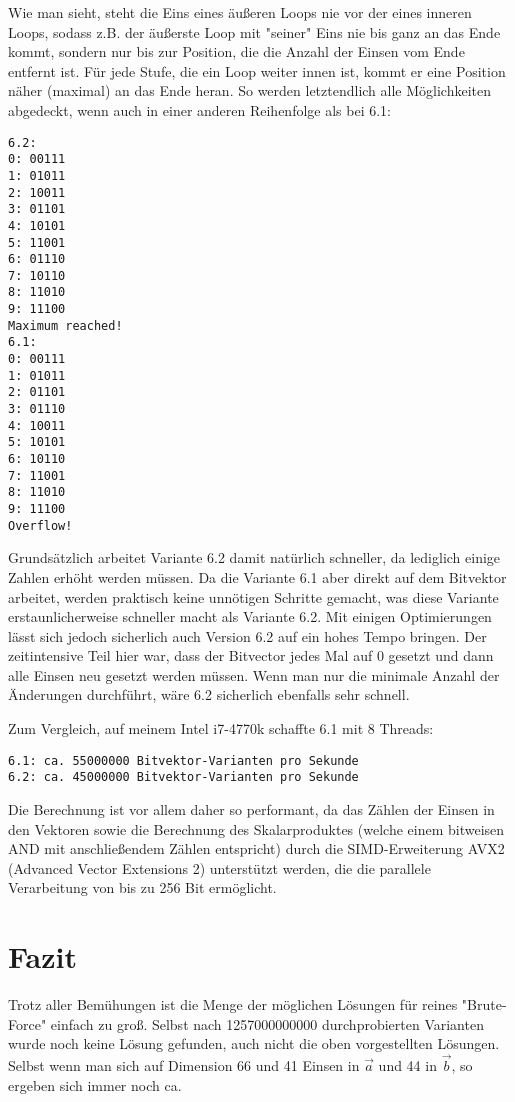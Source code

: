 \documentclass{article}
\begin{document}
Wie man sieht, steht die Eins eines äußeren Loops nie vor der eines inneren Loops, sodass z.B. der äußerste Loop mit "seiner" Eins nie bis ganz an das Ende kommt, sondern nur bis zur Position, die die Anzahl der Einsen vom Ende entfernt ist. Für jede Stufe, die ein Loop weiter innen ist, kommt er eine Position näher (maximal) an das Ende heran. So werden letztendlich alle Möglichkeiten abgedeckt, wenn auch in einer anderen Reihenfolge als bei 6.1:

\begin{lstlisting}[frame=single]
6.2: 
0: 00111
1: 01011
2: 10011
3: 01101
4: 10101
5: 11001
6: 01110
7: 10110
8: 11010
9: 11100
Maximum reached!
6.1:
0: 00111
1: 01011
2: 01101
3: 01110
4: 10011
5: 10101
6: 10110
7: 11001
8: 11010
9: 11100
Overflow!
\end{lstlisting}

Grundsätzlich arbeitet Variante 6.2 damit natürlich schneller, da lediglich einige Zahlen erhöht werden müssen. Da die Variante 6.1 aber direkt auf dem Bitvektor arbeitet, werden praktisch keine unnötigen Schritte gemacht, was diese Variante erstaunlicherweise schneller macht als Variante 6.2. Mit einigen Optimierungen lässt sich jedoch sicherlich auch Version 6.2 auf ein hohes Tempo bringen. Der zeitintensive Teil hier war, dass der Bitvector jedes Mal auf 0 gesetzt und dann alle Einsen neu gesetzt werden müssen. Wenn man nur die minimale Anzahl der Änderungen durchführt, wäre 6.2 sicherlich ebenfalls sehr schnell.

Zum Vergleich, auf meinem Intel i7-4770k schaffte 6.1 mit 8 Threads:
\begin{lstlisting}[frame=single]
6.1: ca. 55000000 Bitvektor-Varianten pro Sekunde
6.2: ca. 45000000 Bitvektor-Varianten pro Sekunde
\end{lstlisting}

Die Berechnung ist vor allem daher so performant, da das Zählen der Einsen in den Vektoren sowie die Berechnung des Skalarproduktes (welche einem bitweisen AND mit anschließendem Zählen entspricht) durch die SIMD-Erweiterung AVX2 (Advanced Vector Extensions 2) unterstützt werden, die die parallele Verarbeitung von bis zu 256 Bit ermöglicht.

\section{Fazit}

Trotz aller Bemühungen ist die Menge der möglichen Lösungen für reines "Brute-Force" einfach zu groß. Selbst nach 1257000000000 durchprobierten Varianten wurde noch keine Lösung gefunden, auch nicht die oben vorgestellten Lösungen. Selbst wenn man sich auf Dimension 66 und 41 Einsen in $\vec a$ und 44 in $\vec b$, so ergeben sich immer noch ca. 
\end{document}

